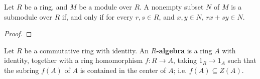 \begin{lemma}\label{lemma_4.1.2}
    Let $R$ be a ring, and $M$ be a module over $R$. A nonempty subset $N$ of $M$
    is a submodule over  $R$ if, and only if for every $r,s \in R$, and  $x,y
    \in N$,  $rx+sy \in N$.
\end{lemma}
\begin{proof}
\end{proof}

\begin{definition}
    Let $R$ be a commutative ring with identity. An \textbf{$R$-algebra} is a
    ring $A$ with identity, together with a ring homomorphism $f:R
    \xrightarrow{} A$, taking $1_R \xrightarrow{} 1_A$ such that the subring
    $f(A)$ of $A$ is contained in the center of  $A$; i.e.  $f(A) \subseteq
    Z(A)$.
\end{definition}
